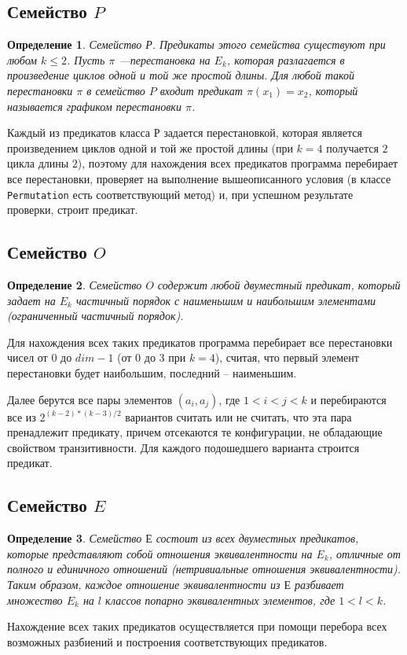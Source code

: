 \documentclass[a4paper,14pt]{extreport}
\newtheorem{opr}{Определение}
\begin{document}
\subsection{Семейство $P$}
\begin{opr}
Семейство Р. Предикаты этого семейства существуют при любом $k \leqslant 2$. Пусть $\pi$ ---перестановка на $E_k$, которая разлагается в произведение циклов одной и той же простой длины. Для любой такой перестановки $\pi$ в семейство $P$ входит предикат $\pi(x_1)=x_2$, который называется графиком перестановки $\pi$. 
\end{opr}

Каждый из предикатов класса $Р$ задается перестановкой, которая является произведением циклов одной и той же простой длины (при $k=4$ получается $2$ цикла длины $2$), поэтому для нахождения всех предикатов программа перебирает все перестановки, проверяет на выполнение вышеописанного условия (в классе {\tt Permutation} есть соответствующий метод) и, при успешном результате проверки, строит предикат.

\subsection{Семейство $O$}
\begin{opr}
Семейство $O$ содержит любой двуместный предикат, который задает на $E_k$ частичный порядок с
наименьшим и наибольшим элементами (ограниченный частичный порядок). 
\end{opr}

Для нахождения всех таких предикатов программа перебирает все перестановки чисел от $0$ до $dim-1$ (от $0$ до $3$ при $k=4$), считая, что первый элемент перестановки будет наибольшим, последний – наименьшим. 

Далее берутся все пары элементов $(a_i,a_j)$, где $1<i<j<k$ и перебираются все из $2^{(k-2)*(k-3)/2}$ вариантов считать или не считать, что эта пара пренадлежит предикату, причем отсекаются те конфигурации, не обладающие свойством транзитивности. Для каждого подошедшего варианта строится предикат.

\subsection{Семейство $E$}
\begin{opr}
Семейство $Е$ состоит из всех двуместных предикатов, которые  представляют собой отношения эквивалентности на $E_{k}$, отличные от полного и единичного отношений (нетривиальные отношения эквивалентности). Таким образом, каждое отношение эквивалентности из $Е$ разбивает множество $E_{k}$ на $l$ классов попарно эквивалентных элементов, где $1 < l < k$. 
\end{opr}
Нахождение всех таких предикатов осуществляется при помощи перебора всех возможных разбиений и построения соответствующих предикатов. 
\end{document}
